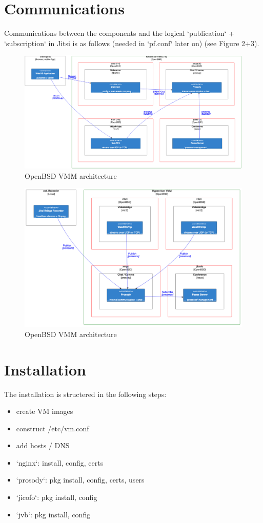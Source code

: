 \documentclass[conference]{IEEEtran}
\begin{document}
\section{Communications}
Communications between the components and the logical `publication` + `subscription` in Jitsi
is as follows (needed in `pf.conf` later on) (see Figure 2+3).
\begin{figure}
    \centering
    \includegraphics[width=16cm]{img/arch-tcp.png}
    \caption{\textsf{OpenBSD VMM architecture}}
\end{figure}
\begin{figure}
    \centering
    \includegraphics[width=16cm]{img/arch-pubsub.png}
    \caption{\textsf{OpenBSD VMM architecture}}
\end{figure}

\section{Installation}
The installation is structered in the following steps:
\begin{itemize}
\item create VM images
\item construct /etc/vm.conf
\item add hosts / DNS
\item `nginx`: install, config, certs
\item `prosody`: pkg install, config, certs, users
\item `jicofo`: pkg install, config
\item `jvb`: pkg install, config
\end{itemize}
\end{document}
